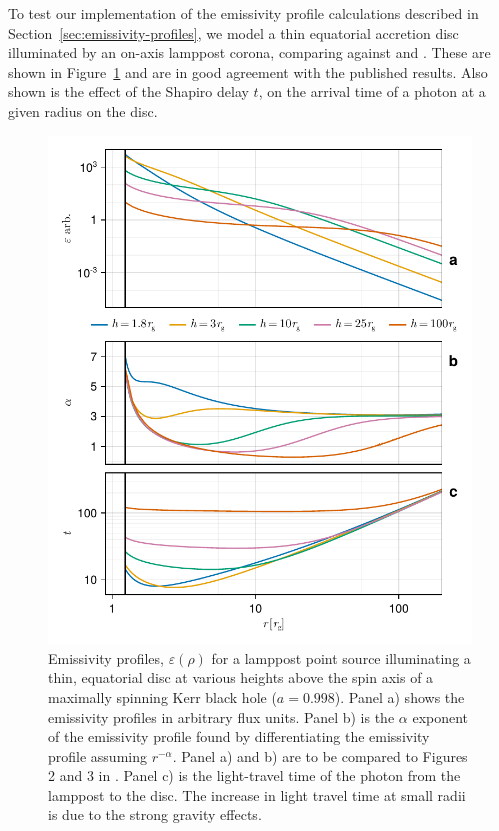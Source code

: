 \documentclass[fleqn,usenatbib]{mnras}
\begin{document}
To test our implementation of the emissivity profile calculations described in
Section~\ref{sec:emissivity-profiles}, we model a thin equatorial accretion disc
illuminated by an on-axis lamppost corona, comparing against
\cite{wilkins_understanding_2012} and \cite{dauser_irradiation_2013}. These are
shown in Figure~\ref{fig:emissivity-profiles} and are in good agreement with the
published results. Also shown is the effect of the Shapiro delay $t$, on the
arrival time of a photon at a given radius on the disc.

\begin{figure}
    \centering
    \includegraphics[width=0.99\columnwidth]{figures/emissivity.point-source.pdf}
    \caption{Emissivity profiles, $\varepsilon(\rho)$ for a lamppost point
        source illuminating a thin, equatorial disc at various heights above the
        spin axis of a maximally spinning Kerr black hole ($a = 0.998$). Panel
        a) shows the emissivity profiles in arbitrary flux units.  Panel b) is
        the $\alpha$ exponent of the emissivity profile found by differentiating
        the emissivity profile assuming $r^{-\alpha}$. Panel a) and b) are to be
        compared to Figures 2 and 3 in \citet{dauser_irradiation_2013}. Panel c)
        is the light-travel time of the photon from the lamppost to the disc.
        The increase in light travel time at small radii is due to the strong
        gravity effects.
}
    \label{fig:emissivity-profiles}
\end{figure}
\end{document}

